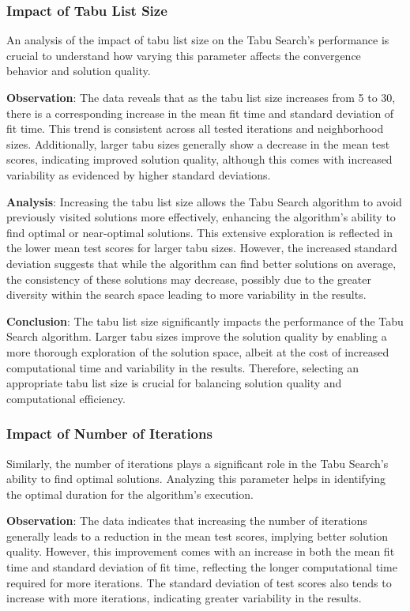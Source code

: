 \documentclass[
]{article}
\begin{document}
    \subsubsection{Impact of Tabu List Size}

    An analysis of the impact of tabu list size on the Tabu Search's performance is crucial to understand how varying this parameter affects the convergence behavior and solution quality.

    \textbf{Observation}: The data reveals that as the tabu list size increases from 5 to 30, there is a corresponding increase in the mean fit time and standard deviation of fit time. This trend is consistent across all tested iterations and neighborhood sizes. Additionally, larger tabu sizes generally show a decrease in the mean test scores, indicating improved solution quality, although this comes with increased variability as evidenced by higher standard deviations.

    \textbf{Analysis}: Increasing the tabu list size allows the Tabu Search algorithm to avoid previously visited solutions more effectively, enhancing the algorithm's ability to find optimal or near-optimal solutions. This extensive exploration is reflected in the lower mean test scores for larger tabu sizes. However, the increased standard deviation suggests that while the algorithm can find better solutions on average, the consistency of these solutions may decrease, possibly due to the greater diversity within the search space leading to more variability in the results.

    \textbf{Conclusion}: The tabu list size significantly impacts the performance of the Tabu Search algorithm. Larger tabu sizes improve the solution quality by enabling a more thorough exploration of the solution space, albeit at the cost of increased computational time and variability in the results. Therefore, selecting an appropriate tabu list size is crucial for balancing solution quality and computational efficiency.

    \subsubsection{Impact of Number of Iterations}

    Similarly, the number of iterations plays a significant role in the Tabu Search's ability to find optimal solutions. Analyzing this parameter helps in identifying the optimal duration for the algorithm’s execution.

    \textbf{Observation}: The data indicates that increasing the number of iterations generally leads to a reduction in the mean test scores, implying better solution quality. However, this improvement comes with an increase in both the mean fit time and standard deviation of fit time, reflecting the longer computational time required for more iterations. The standard deviation of test scores also tends to increase with more iterations, indicating greater variability in the results.
\end{document}
